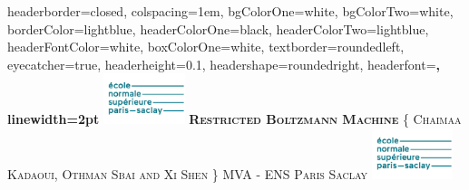 \documentclass[landscape,a1paper,fontscale=0.5]{baposter} %
\begin{document}
\begin{poster}
{
headerborder=closed, %
colspacing=1em, %
bgColorOne=white, %
bgColorTwo=white, %
borderColor=lightblue, %
headerColorOne=black, %
headerColorTwo=lightblue, %
headerFontColor=white, %
boxColorOne=white, %
textborder=roundedleft, %
eyecatcher=true, %
headerheight=0.1\textheight, %
headershape=roundedright, %
headerfont=\Large\bf\textsc, %
linewidth=2pt %
}
%
{\includegraphics[height=4em]{logo.png}} %
{\bf\textsc{Restricted Boltzmann Machine}\vspace{0.5em}} %
{\textsc{\{ Chaimaa Kadaoui, Othman Sbai and Xi Shen \} \hspace{12pt} MVA - ENS Paris Saclay}} %
{\includegraphics[height=4em]{logo.png}} %



\end{poster}
\end{document}
